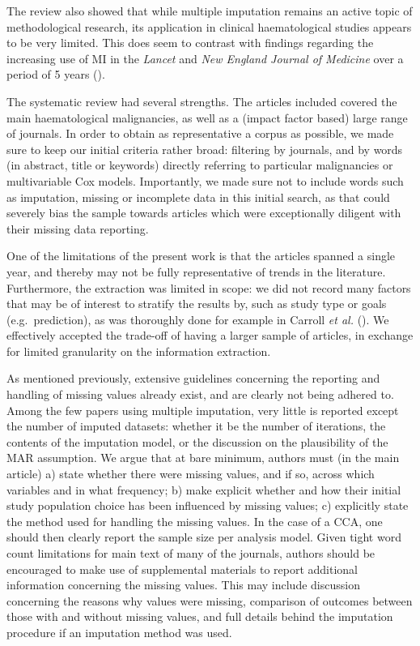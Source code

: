 \documentclass[
  letterpaper,
  DIV=11,
  numbers=noendperiod]{scrreprt}
\begin{document}
The review also showed that while multiple imputation remains an active
topic of methodological research, its application in clinical
haematological studies appears to be very limited. This does seem to
contrast with findings regarding the increasing use of MI in the
\emph{Lancet} and \emph{New England Journal of Medicine} over a period
of 5 years ().

The systematic review had several strengths. The articles included
covered the main haematological malignancies, as well as a (impact
factor based) large range of journals. In order to obtain as
representative a corpus as possible, we made sure to keep our initial
criteria rather broad: filtering by journals, and by words (in abstract,
title or keywords) directly referring to particular malignancies or
multivariable Cox models. Importantly, we made sure not to include words
such as imputation, missing or incomplete data in this initial search,
as that could severely bias the sample towards articles which were
exceptionally diligent with their missing data reporting.

One of the limitations of the present work is that the articles spanned
a single year, and thereby may not be fully representative of trends in
the literature. Furthermore, the extraction was limited in scope: we did
not record many factors that may be of interest to stratify the results
by, such as study type or goals (e.g.~prediction), as was thoroughly
done for example in Carroll \emph{et al.}
(). We effectively accepted
the trade-off of having a larger sample of articles, in exchange for
limited granularity on the information extraction.

As mentioned previously, extensive guidelines concerning the reporting
and handling of missing values already exist, and are clearly not being
adhered to. Among the few papers using multiple imputation, very little
is reported except the number of imputed datasets: whether it be the
number of iterations, the contents of the imputation model, or the
discussion on the plausibility of the MAR assumption. We argue that at
bare minimum, authors must (in the main article) a) state whether there
were missing values, and if so, across which variables and in what
frequency; b) make explicit whether and how their initial study
population choice has been influenced by missing values; c) explicitly
state the method used for handling the missing values. In the case of a
CCA, one should then clearly report the sample size per analysis model.
Given tight word count limitations for main text of many of the
journals, authors should be encouraged to make use of supplemental
materials to report additional information concerning the missing
values. This may include discussion concerning the reasons why values
were missing, comparison of outcomes between those with and without
missing values, and full details behind the imputation procedure if an
imputation method was used.
\end{document}
